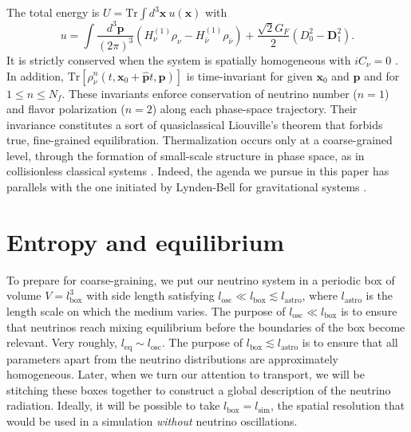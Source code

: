 \documentclass[aps,prd,twocolumn,groupedaddress,preprintnumbers]{revtex4-2}
\begin{document}
The total energy is $U = \textrm{Tr} \int d^3\boldsymbol{x}~u(\boldsymbol{x})$ with
\begin{equation}
u = \int \frac{d^3 \boldsymbol{p}}{(2\pi)^3} \left( H_{\nu}^{(1)} \rho_\nu - H_{\bar{\nu}}^{(1)} \rho_{\bar{\nu}}  \right) + \frac{\sqrt{2} G_F}{2} \left( D_0^2 - \boldsymbol{D}_1^2 \right). \label{eq:uenergy}
\end{equation}
It is strictly conserved when the system is spatially homogeneous with $iC_{\nu} = 0$ \cite{fiorillo2024}. In addition, $\textrm{Tr}[\rho^{n}_\nu (t, \boldsymbol{x}_0 + \boldsymbol{\hat{p}} t, \boldsymbol{p})]$ is time-invariant for given $\boldsymbol{x}_0$ and $\boldsymbol{p}$ and for $1 \leq n \leq N_f$. These invariants enforce conservation of neutrino number ($n = 1$) and flavor polarization ($n = 2$) along each phase-space trajectory. Their invariance constitutes a sort of quasiclassical Liouville's theorem that forbids true, fine-grained equilibration. Thermalization occurs only at a coarse-grained level, through the formation of small-scale structure in phase space, as in collisionless classical systems \cite{johns2020b}. Indeed, the agenda we pursue in this paper has parallels with the one initiated by Lynden-Bell for gravitational systems \cite{lynden1967}.











\section{Entropy and equilibrium}

To prepare for coarse-graining, we put our neutrino system in a periodic box of volume $V = l_\textrm{box}^3$ with side length satisfying $l_\textrm{osc} \ll l_\textrm{box} \lesssim l_\textrm{astro}$, where $l_\textrm{astro}$ is the length scale on which the medium varies. The purpose of $l_\textrm{osc} \ll l_\textrm{box}$ is to ensure that neutrinos reach mixing equilibrium before the boundaries of the box become relevant. Very roughly, $l_\textrm{eq} \sim l_\textrm{osc}$. The purpose of $l_\textrm{box} \lesssim l_\textrm{astro}$ is to ensure that all parameters apart from the neutrino distributions are approximately homogeneous. Later, when we turn our attention to transport, we will be stitching these boxes together to construct a global description of the neutrino radiation. Ideally, it will be possible to take $l_\textrm{box} = l_\textrm{sim}$, the spatial resolution that would be used in a simulation \textit{without} neutrino oscillations.
\end{document}
